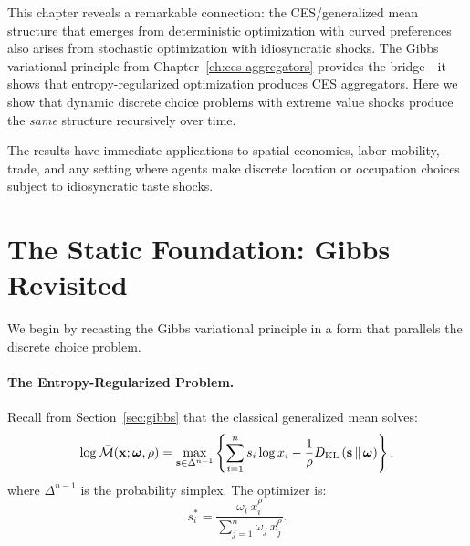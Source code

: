 
\label{ch:discrete-choice}

This chapter reveals a remarkable connection: the CES/generalized mean structure that emerges from deterministic optimization with curved preferences also arises from stochastic optimization with idiosyncratic shocks. The Gibbs variational principle from Chapter~\ref{ch:ces-aggregators} provides the bridge---it shows that entropy-regularized optimization produces CES aggregators. Here we show that dynamic discrete choice problems with extreme value shocks produce the \emph{same} structure recursively over time.

The results have immediate applications to spatial economics, labor mobility, trade, and any setting where agents make discrete location or occupation choices subject to idiosyncratic taste shocks.

\section{The Static Foundation: Gibbs Revisited}
\label{sec:gibbs-revisited}

We begin by recasting the Gibbs variational principle in a form that parallels the discrete choice problem.

\paragraph{The Entropy-Regularized Problem.}

Recall from Section~\ref{sec:gibbs} that the classical generalized mean solves:
\begin{equation}
\label{eq:gibbs-static}
\log \bar{\mathcal{M}}(\mathbf{x}; \boldsymbol{\omega}, \rho) = \max_{\mathbf{s} \in \Delta^{n-1}} \left\{ \sum_{i=1}^n s_i \log x_i - \frac{1}{\rho} D_{\mathrm{KL}}\left(\mathbf{s} \,\|\, \boldsymbol{\omega}\right) \right\},
\end{equation}
where $\Delta^{n-1}$ is the probability simplex. The optimizer is:
\begin{equation}
\label{eq:gibbs-shares}
s_i^* = \frac{\omega_i \, x_i^\rho}{\sum_{j=1}^n \omega_j \, x_j^\rho}.
\end{equation}

